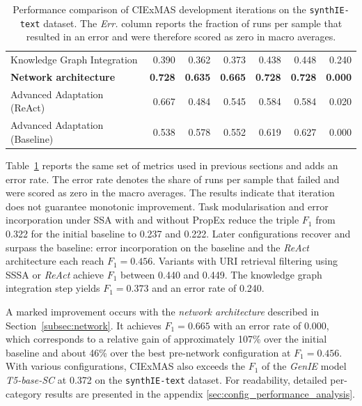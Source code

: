 \documentclass[a4paper,oneside,bibliography=totoc]{scrbook}
\begin{document}
\begin{table}[h]
\begin{tabular}{p{5cm}|rrrrrr}
    Knowledge Graph Integration                  & 0.390                                         & 0.362          & 0.373          & 0.438          & 0.448          & 0.240          \\
    \textbf{Network architecture}                & \textbf{0.728}                                & \textbf{0.635} & \textbf{0.665} & \textbf{0.728} & \textbf{0.728} & \textbf{0.000} \\
    Advanced Adaptation (ReAct)                  & 0.667                                         & 0.484          & 0.545          & 0.584          & 0.584          & 0.020          \\
    Advanced Adaptation (Baseline)               & 0.538                                         & 0.578          & 0.552          & 0.619          & 0.627          & 0.000          \\
    \bottomrule
  \end{tabular}
  \caption{Performance comparison of CIExMAS development iterations on the \texttt{synthIE\allowbreak-text} dataset. The \emph{Err.} column reports the fraction of runs per sample that resulted in an error and were therefore scored as zero in macro averages.}
  \label{tab:evaluation_iterations}
\end{table}

Table~\ref{tab:evaluation_iterations} reports the same set of metrics used in previous sections and adds an error rate. The error rate denotes the share of runs per sample that failed and were scored as zero in the macro averages. The results indicate that iteration does not guarantee monotonic improvement. Task modularisation and error incorporation under \ac{SSA} with and without \ac{PropEx} reduce the triple $F_1$ from 0.322 for the initial baseline to 0.237 and 0.222. Later configurations recover and surpass the baseline: error incorporation on the baseline and the \textit{ReAct} architecture each reach $F_1=0.456$. Variants with URI retrieval filtering using \ac{SSSA} or \textit{ReAct} achieve $F_1$ between 0.440 and 0.449. The knowledge graph integration step yields $F_1=0.373$ and an error rate of 0.240.

A marked improvement occurs with the \textit{network architecture} described in Section~\ref{subsec:network}. It achieves $F_1=0.665$ with an error rate of 0.000, which corresponds to a relative gain of approximately 107\% over the initial baseline and about 46\% over the best pre-network configuration at $F_1=0.456$. With various configurations, CIExMAS also exceeds the $F_1$ of the \textit{GenIE} model \textit{T5-base-SC} at 0.372 on the \texttt{synthIE-text} dataset. For readability, detailed per-category results are presented in the appendix \ref{sec:config_performance_analysis}.
\end{document}
